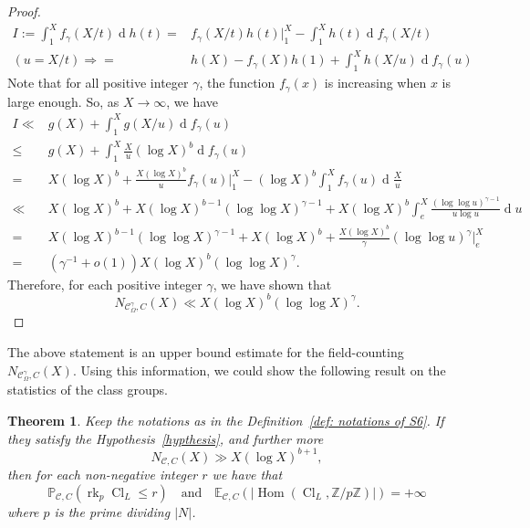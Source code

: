 \documentclass[12pt,a4paper]{amsart}
\numberwithin{equation}{section}%
\theoremstyle{plain}%
\newtheorem{theorem}{Theorem}[section]%
\theoremstyle{definition}%
\theoremstyle{remark}%
\begin{document}
\begin{proof}
    	\begin{align*}
    		I:=\int_{1}^{X}f_{\gamma}(X/t)\operatorname{d}h(t)
    		=& f_{\gamma}(X/t)h(t)\Big\vert_{1}^{X}-\int_{1}^{X}h(t)\operatorname{d}f_{\gamma}(X/t) \\
    		(u=X/t)\Rightarrow=& h(X)-f_{\gamma}(X)h(1)+\int_{1}^{X}h(X/u)\operatorname{d}f_{\gamma}(u)   		
    	\end{align*}
    	Note that for all positive integer $\gamma$, the function $f_{\gamma}(x)$ is increasing when $x$ is large enough.
    	So, as $X\to\infty$, we have
    	\begin{align*}
    		I\ll & g(X)+\int_{1}^{X}g(X/u)\operatorname{d}f_{\gamma}(u) \\
    		\leq & g(X)+\int_{1}^{X}\frac{X}{u}(\log X)^{b}\operatorname{d}f_{\gamma}(u) \\
    		= & X(\log X)^{b}+\frac{X(\log X)^{b}}{u}f_{\gamma}(u)\Big\vert_{1}^{X}-(\log X)^{b}\int_{1}^{X}f_{\gamma}(u)\operatorname{d}\frac{X}{u} \\
    		\ll & X(\log X)^{b}+X(\log X)^{b-1}(\log\log X)^{\gamma-1}+X(\log X)^{b}\int_{e}^{X}\frac{(\log\log u)^{\gamma-1}}{u\log u}\operatorname{d}u \\
    		=& X(\log X)^{b-1}(\log\log X)^{\gamma-1}+X(\log X)^{b}+\frac{X(\log X)^{b}}{\gamma}(\log\log u)^{\gamma}\Big\vert_{e}^{X} \\
    		=& (\gamma^{-1}+o(1))X(\log X)^{b}(\log\log X)^{\gamma}.
    	\end{align*}    	
    	Therefore, for each positive integer $\gamma$, we have shown that 
    	\begin{equation*}
    		N_{\mathcal{C}_{\Omega}^{\gamma},C}(X)\ll X(\log X)^{b}(\log\log X)^{\gamma}.
    	\end{equation*}
    \end{proof}
    The above statement is an upper bound estimate for the field-counting $N_{\mathcal{C}_{\Omega}^{\gamma},C}(X)$.
    Using this information, we could show the following result on the statistics of the class groups.
    \begin{theorem}\label{thm: infinite moment S6}
    	Keep the notations as in the Definition~\ref{def: notations of S6}.
    	If they satisfy the Hypothesis~\ref{hypthesis}, and further more
    	\begin{equation*}
    		N_{\mathcal{C},C}(X)\gg X(\log X)^{b+1},
    	\end{equation*}
    	then for each non-negative integer $r$ we have that
    	\begin{equation*}
    		\mathbb{P}_{\mathcal{C},C}(\operatorname{rk}_{p}\operatorname{Cl}_{L}\leq r)
    		\quad\text{and}\quad
    		\mathbb{E}_{\mathcal{C},C}(\lvert\operatorname{Hom}(\operatorname{Cl}_{L},\mathbb{Z}/p\mathbb{Z})\rvert)=+\infty
    	\end{equation*}
    	where $p$ is the prime dividing $\lvert N\rvert$.
    \end{theorem}
\end{document}
